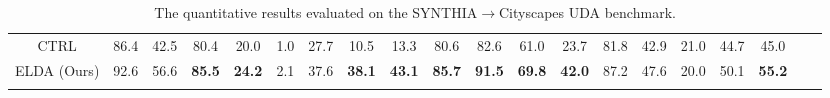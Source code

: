 \documentclass{bmvc2k}
\begin{document}
\begin{table*}[t]
{\begin{tabular}{llllllllllllllllllll}
\multicolumn{1}{c|}{CTRL\cite{Saha_2021_CVPR_CTRL}} & \multicolumn{1}{c}{86.4} & \multicolumn{1}{c}{42.5} & \multicolumn{1}{c}{80.4} & \multicolumn{1}{c}{20.0} & \multicolumn{1}{c}{1.0} & \multicolumn{1}{c}{27.7} & \multicolumn{1}{c}{10.5} & \multicolumn{1}{c}{13.3} & \multicolumn{1}{c}{80.6} & \multicolumn{1}{c}{82.6} & \multicolumn{1}{c}{61.0} & \multicolumn{1}{c}{23.7} & \multicolumn{1}{c}{81.8} & \multicolumn{1}{c}{42.9} & \multicolumn{1}{c}{21.0} & \multicolumn{1}{c|}{44.7} &  \multicolumn{1}{c}{45.0} \\
\multicolumn{1}{c|}{ELDA (Ours)} & \multicolumn{1}{c}{92.6} & \multicolumn{1}{c}{56.6} & \multicolumn{1}{c}{\textbf{85.5}} & \multicolumn{1}{c}{\textbf{24.2}} & \multicolumn{1}{c}{2.1} & \multicolumn{1}{c}{37.6} & \multicolumn{1}{c}{\textbf{38.1}} & \multicolumn{1}{c}{\textbf{43.1}} & \multicolumn{1}{c}{\textbf{85.7}} & \multicolumn{1}{c}{\textbf{91.5}} & \multicolumn{1}{c}{\textbf{69.8}} & \multicolumn{1}{c}{\textbf{42.0}} & \multicolumn{1}{c}{87.2} & \multicolumn{1}{c}{47.6} & \multicolumn{1}{c}{20.0} & \multicolumn{1}{c|}{50.1} & \multicolumn{1}{c}{\textbf{55.2}} \\
\mytoprule
\end{tabular}}
\caption{The quantitative results evaluated on the SYNTHIA$\to$Cityscapes UDA benchmark.}
\label{tab:syn_benchmark}
\end{table*} 
\end{document}
